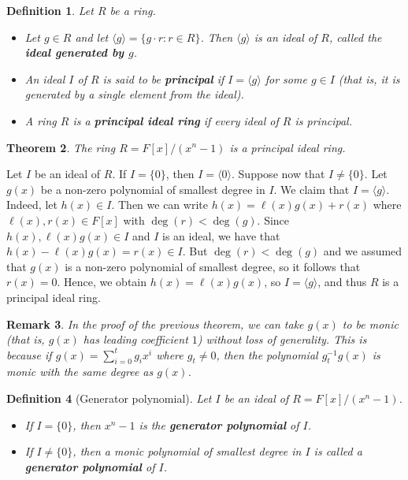 \documentclass[10pt]{article}
\makeatletter
\theoremstyle{newstyle}
\newtheorem{thm}{Theorem}[subsection]
\newtheorem{remark}[thm]{Remark}
\newtheorem{defn}[thm]{Definition}
\newenvironment{pf}[1][\proofname]{\par
  \pushQED{\qed}%
  \normalfont \topsep0\p@\relax
  \trivlist
  \item[\hskip\labelsep\scshape
  #1\@addpunct{.}]\ignorespaces
}{%
  \popQED\endtrivlist\@endpefalse
}
\makeatother
\begin{document}
\begin{defn}
Let $R$ be a ring.
\begin{itemize}
    \item Let $g \in R$ and let $\langle g \rangle = \{g \cdot r : r \in R\}$. Then 
    $\langle g \rangle$ is an ideal of $R$, called the {\bf ideal generated by $g$}. 
    \item An ideal $I$ of $R$ is said to be {\bf principal} if $I = \langle g \rangle$ 
    for some $g \in I$ (that is, it is generated by a single element from the ideal). 
    \item A ring $R$ is a {\bf principal ideal ring} if every ideal of $R$ is principal.
\end{itemize}
\end{defn}

\begin{thm}
The ring $R = F[x]/(x^n-1)$ is a principal ideal ring.
\end{thm}
\begin{pf}
Let $I$ be an ideal of $R$. If $I = \{0\}$, then $I = \langle 0 \rangle$. 
Suppose now that $I \neq \{0\}$. Let $g(x)$ be a non-zero polynomial of smallest degree in $I$. 
We claim that $I = \langle g \rangle$. Indeed, let $h(x) \in I$. Then we can 
write $h(x) = \ell(x) g(x) + r(x)$ where $\ell(x), r(x) \in F[x]$ with $\deg(r) < \deg(g)$. Since 
$h(x), \ell(x)g(x) \in I$ and $I$ is an ideal, we have that $h(x) - \ell(x)g(x) = r(x) \in I$. 
But $\deg(r) < \deg(g)$ and we assumed that $g(x)$ is a non-zero polynomial of smallest 
degree, so it follows that $r(x) = 0$. Hence, we obtain $h(x) = \ell(x)g(x)$, so 
$I = \langle g \rangle$, and thus $R$ is a principal ideal ring. 
\end{pf}

\begin{remark}
In the proof of the previous theorem, we can take $g(x)$ to be monic (that is, $g(x)$ has 
leading coefficient $1$) without loss of generality. This is because if $g(x) = 
\sum_{i=0}^t g_i x^i$ where $g_t \neq 0$, then the polynomial $g_t^{-1} g(x)$ is monic with 
the same degree as $g(x)$. 
\end{remark}

\begin{defn}[Generator polynomial]
Let $I$ be an ideal of $R = F[x]/(x^n-1)$. 
\begin{itemize}
    \item If $I = \{0\}$, then $x^n-1$ is the {\bf generator polynomial} of $I$.
    \item If $I \neq \{0\}$, then a monic polynomial of smallest degree in $I$ is called 
    a {\bf generator polynomial} of $I$.
\end{itemize}
\end{defn}
\end{document}
